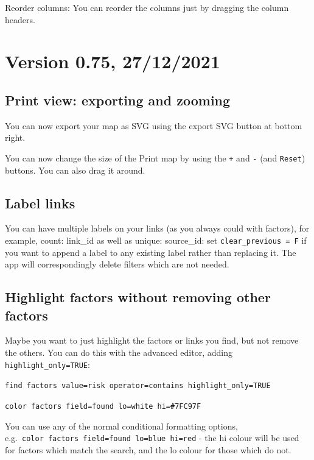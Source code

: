 \documentclass[
]{book}
\begin{document}
Reorder columns: You can reorder the columns just by dragging the column headers.

\hypertarget{version-0.75-27122021}{%
\section{Version 0.75, 27/12/2021}\label{version-0.75-27122021}}

\hypertarget{print-view-exporting-and-zooming}{%
\subsection{Print view: exporting and zooming}\label{print-view-exporting-and-zooming}}

You can now export your map as SVG using the export SVG button at bottom right.

You can now change the size of the Print map by using the \texttt{+} and \texttt{-} (and \texttt{Reset}) buttons. You can also drag it around.

\hypertarget{label-links}{%
\subsection{Label links}\label{label-links}}

You can have multiple labels on your links (as you always could with factors), for example, count: link\_id as well as unique: source\_id: set \texttt{clear\_previous\ =\ F} if you want to append a label to any existing label rather than replacing it. The app will correspondingly delete filters which are not needed.

\hypertarget{highlight-factors-without-removing-other-factors}{%
\subsection{Highlight factors without removing other factors}\label{highlight-factors-without-removing-other-factors}}

Maybe you want to just highlight the factors or links you find, but not remove the others. You can do this with the advanced editor, adding \texttt{highlight\_only=TRUE}:

\texttt{find\ factors\ value=risk\ operator=contains\ highlight\_only=TRUE}

\texttt{color\ factors\ field=found\ lo=white\ hi=\#7FC97F}

You can use any of the normal conditional formatting options, e.g.~\texttt{color\ factors\ field=found\ lo=blue\ hi=red} - the hi colour will be used for factors which match the search, and the lo colour for those which do not.
\end{document}
